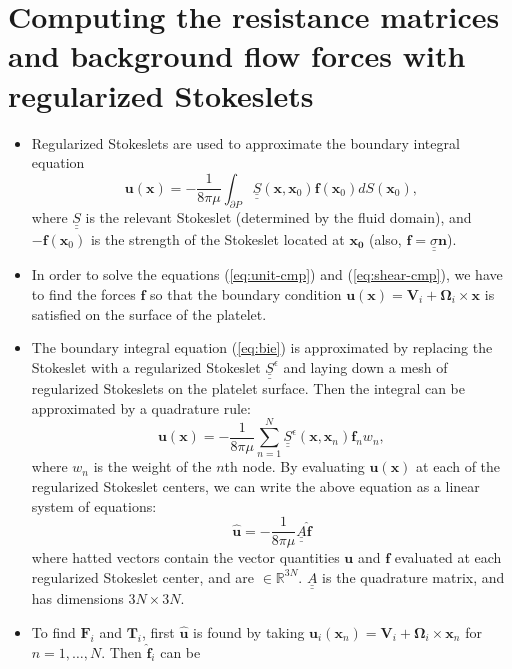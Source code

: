 \documentclass{article}
\newcommand{\vect}[1]{\boldsymbol{\mathbf{#1}}}
\newcommand{\mat}[1]{\underline{\underline{#1}}}
\def\R{\mathbb{R}}
\begin{document}
\section{Computing the resistance matrices and background flow forces
  with regularized Stokeslets}
\label{sec:comp-resist-matr}

\begin{itemize}
\item Regularized Stokeslets are used to approximate the boundary
  integral equation
  \begin{equation}
    \vect{u}(\vect{x}) = -\frac{1}{8\pi\mu} \int_{\partial P}
    \mat{S}(\vect{x}, \vect{x}_0) \vect{f}(\vect{x}_0) dS(\vect{x}_0),
    \label{eq:bie}
  \end{equation}
  where $\mat{S}$ is the relevant Stokeslet (determined by the fluid
  domain), and $-\vect{f}(\vect{x}_0)$ is the strength of the Stokeslet
  located at $\vect{x_0}$ (also, $\vect{f} = \mat{\sigma}\vect{n}$).
\item In order to solve the equations (\ref{eq:unit-cmp}) and
  (\ref{eq:shear-cmp}), we have to find the forces $\vect{f}$ so that
  the boundary condition $\vect{u}(\vect{x}) = \vect{V}_i +
  \vect{\Omega}_i \times \vect{x}$ is satisfied on the surface of the
  platelet.
\item The boundary integral equation (\ref{eq:bie}) is approximated by
  replacing the Stokeslet with a regularized Stokeslet
  $\mat{S}^\epsilon$ and laying down a mesh of regularized Stokeslets
  on the platelet surface. Then the integral can be approximated by a
  quadrature rule:
  \[
    \vect{u}(\vect{x}) = -\frac{1}{8\pi\mu} \sum_{n =
      1}^N \mat{S}^\epsilon(\vect{x}, \vect{x}_n) \vect{f}_n w_n,
  \]
  where $w_n$ is the weight of the $n$th node. By evaluating
  $\vect{u}(\vect{x})$ at each of the regularized Stokeslet centers,
  we can write the above equation as a linear system of equations:
  \begin{equation}
    \hat{\vect{u}} = -\frac{1}{8\pi\mu} \mat{A}
    \hat{\vect{f}} \label{eq:quad-sys} 
  \end{equation}
  where hatted vectors contain the vector quantities $\vect{u}$ and
  $\vect{f}$ evaluated at each regularized Stokeslet center, and are
  $\in \R^{3N}$. $\mat{A}$ is the quadrature matrix, and has
  dimensions $3N \times 3N$.
\item To find $\vect{F}_i$ and $\vect{T}_i$, first $\hat{\vect{u}}$ is
  found by taking
  $\vect{u}_i(\vect{x}_n) = \vect{V}_i + \vect{\Omega}_i \times
  \vect{x}_n$ for $n = 1, \hdots, N$. Then $\hat{\vect{f}}_i$ can be

\end{itemize}
\end{document}
